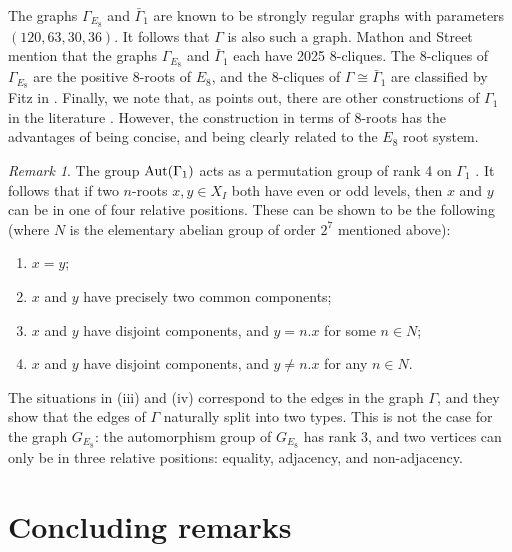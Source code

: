 \documentclass[11pt]{amsart}
\theoremstyle{plain}
\theoremstyle{definition}
\theoremstyle{remark}
\newtheorem{rmk}[theorem]{Remark}
\numberwithin{equation}{subsection}
\newcommand{\Aut}{\text{\rm Aut}}
\begin{document}
The graphs $\Gamma_{E_8}$ and $\bar\Gamma_1$ are known to be strongly
regular graphs with parameters $(120, 63, 30, 36)$. It follows that $\Gamma$ is
also such a graph.  Mathon and Street \cite[Table 2.2]{mathon97} mention that
the graphs $\Gamma_{E_8}$ and $\bar\Gamma_1$ each have 2025 $8$-cliques. The
8-cliques of $\Gamma_{E_8}$ are the positive $8$-roots of $E_8$, and the 8-cliques of $\Gamma\cong \bar\Gamma_1$
are classified by Fitz in \cite[Theorem 7.6]{fitz}. Finally, we
note that, as \cite{schmidt24} points out, there are other constructions of
$\Gamma_1$ in the literature \cite{brouwer89, mathon97}. However, the
construction in terms of $8$-roots has the advantages of being concise, and
being clearly related to the $E_8$ root system.

\begin{rmk}
    \label{rmk:rank4}
The group $\Aut(\Gamma_1)$ acts as a permutation group of rank 4 on $\Gamma_1$
\cite{brouwer89}.  It follows that if two $n$-roots $x,y\in X_I$ both have even
or odd levels, then $x$ and $y$ can be in one of four relative positions. These
can be shown to be the following (where $N$ is the elementary abelian group of
order $2^7$ mentioned above):
\begin{enumerate}
    \item[(i)]{$x=y$;}
    \item[(ii)]{$x$ and $y$ have precisely two common components;}
    \item[(iii)]{$x$ and $y$ have disjoint components,  and $y = n.x$ for some
             $n \in N$;}
         \item[(iv)]{$x$ and $y$ have disjoint components, and $y \ne n.x$ for
      any $n \in N$.}
\end{enumerate} The situations in (iii) and (iv) correspond to the edges in the
    graph $\Gamma$, and they show that the edges of $\Gamma$ naturally split into
    two types. This is not the case for the graph $G_{E_8}$: the automorphism
    group of $G_{E_8}$ has rank 3, and two vertices can only be in three
    relative positions: equality, adjacency, and non-adjacency.
\end{rmk}





\section{Concluding remarks}
\label{sec:conclusions}
\end{document}
